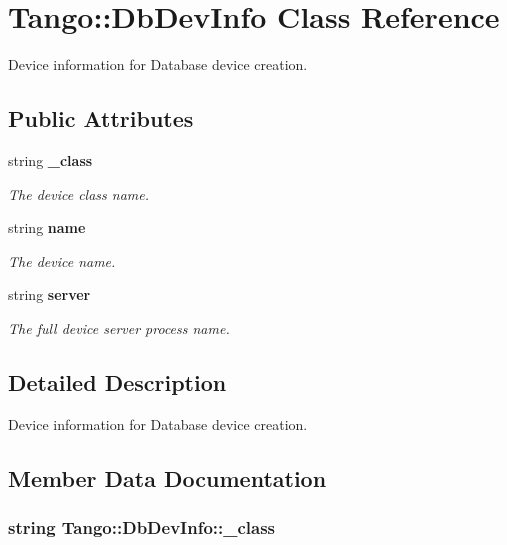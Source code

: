 \section{Tango\-:\-:Db\-Dev\-Info Class Reference}
\label{classTango_1_1DbDevInfo}


Device information for Database device creation.  


\subsection*{Public Attributes}
\begin{DoxyCompactItemize}
\item 
string {\bf \-\_\-class}
\begin{DoxyCompactList}\small\item\em The device class name. \end{DoxyCompactList}\item 
string {\bf name}
\begin{DoxyCompactList}\small\item\em The device name. \end{DoxyCompactList}\item 
string {\bf server}
\begin{DoxyCompactList}\small\item\em The full device server process name. \end{DoxyCompactList}\end{DoxyCompactItemize}


\subsection{Detailed Description}
Device information for Database device creation. 

\subsection{Member Data Documentation}
\subsubsection[{\-\_\-class}]{\setlength{\rightskip}{0pt plus 5cm}string Tango\-::\-Db\-Dev\-Info\-::\-\_\-class}\label{classTango_1_1DbDevInfo_adb109d7fbbcf158b4c78331429c82617}


